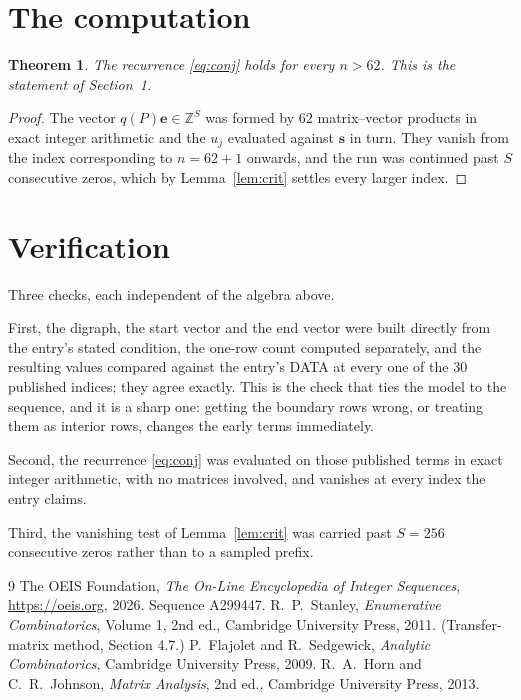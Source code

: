 \documentclass[11pt,a4paper]{article}
\theoremstyle{plain}
\newtheorem{theorem}{Theorem}
\theoremstyle{definition}
\begin{document}
\section{The computation}

\begin{theorem}
The recurrence \eqref{eq:conj} holds for every $n>62$. This is the statement of
Section~1.
\end{theorem}

\begin{proof}
The vector $q(P)\mathbf{e}\in\mathbb{Z}^{S}$ was formed by $62$ matrix--vector
products in exact integer arithmetic and the $u_j$ evaluated against $\mathbf{s}$ in turn.
They vanish from the index corresponding to $n=62+1$ onwards, and the run was continued
past $S$ consecutive zeros, which by Lemma~\ref{lem:crit} settles every larger index.
\end{proof}

\section{Verification}

Three checks, each independent of the algebra above.

First, the digraph, the start vector and the end vector were built directly from the
entry's stated condition, the one-row count computed separately, and the resulting values
compared against the entry's DATA at every one of the $30$ published indices; they
agree exactly. This is the check that ties the model to the sequence, and it is a sharp one:
getting the boundary rows wrong, or treating them as interior rows, changes the early terms
immediately.

Second, the recurrence \eqref{eq:conj} was evaluated on those published terms in exact
integer arithmetic, with no matrices involved, and vanishes at every index the entry claims.

Third, the vanishing test of Lemma~\ref{lem:crit} was carried past $S=256$ consecutive
zeros rather than to a sampled prefix.

\begin{thebibliography}{9}
 The OEIS Foundation, \emph{The On-Line Encyclopedia of Integer
Sequences}, \url{https://oeis.org}, 2026. Sequence A299447.
 R.~P.~Stanley, \emph{Enumerative Combinatorics}, Volume 1, 2nd ed.,
Cambridge University Press, 2011. (Transfer-matrix method, Section 4.7.)
 P.~Flajolet and R.~Sedgewick, \emph{Analytic Combinatorics}, Cambridge
University Press, 2009.
 R.~A.~Horn and C.~R.~Johnson, \emph{Matrix Analysis}, 2nd ed., Cambridge
University Press, 2013.
\end{thebibliography}
\end{document}

